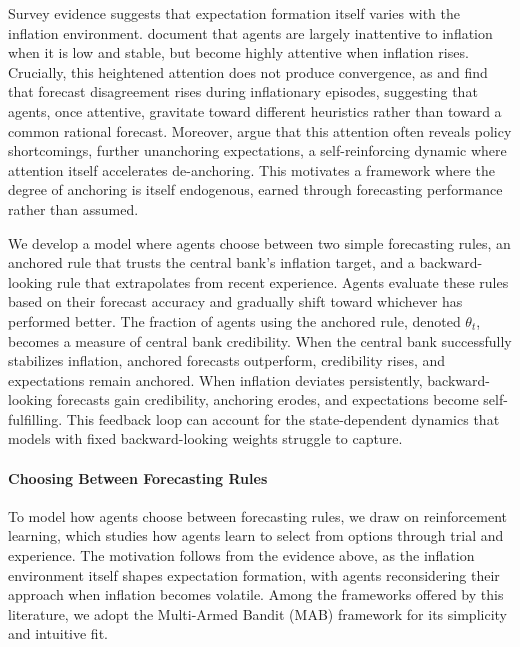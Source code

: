 \documentclass[10pt]{article}
\begin{document}
Survey evidence suggests that expectation formation itself varies with the inflation environment. \citet{weber2025} document that agents are largely inattentive to inflation when it is low and stable, but become highly attentive when inflation rises. Crucially, this heightened attention does not produce convergence, as \citet{mankiw2003disagreement} and \citet{coibion2015} find that forecast disagreement rises during inflationary episodes, suggesting that agents, once attentive, gravitate toward different heuristics rather than toward a common rational forecast. Moreover, \citet{coibion2025inflation} argue that this attention often reveals policy shortcomings, further unanchoring expectations, a self-reinforcing dynamic where attention itself accelerates de-anchoring. This motivates a framework where the degree of anchoring is itself endogenous, earned through forecasting performance rather than assumed.

We develop a model where agents choose between two simple forecasting rules, an anchored rule that trusts the central bank's inflation target, and a backward-looking rule that extrapolates from recent experience. Agents evaluate these rules based on their forecast accuracy and gradually shift toward whichever has performed better. The fraction of agents using the anchored rule, denoted $\theta_t$, becomes a measure of central bank credibility. When the central bank successfully stabilizes inflation, anchored forecasts outperform, credibility rises, and expectations remain anchored. When inflation deviates persistently, backward-looking forecasts gain credibility, anchoring erodes, and expectations become self-fulfilling. This feedback loop can account for the state-dependent dynamics that models with fixed backward-looking weights struggle to capture.

\paragraph{Choosing Between Forecasting Rules}

To model how agents choose between forecasting rules, we draw on reinforcement learning, which studies how agents learn to select from options through trial and experience. The motivation follows from the evidence above, as the inflation environment itself shapes expectation formation, with agents reconsidering their approach when inflation becomes volatile. Among the frameworks offered by this literature, we adopt the Multi-Armed Bandit (MAB) framework \citep{sutton2018reinforcement} for its simplicity and intuitive fit.
\end{document}

